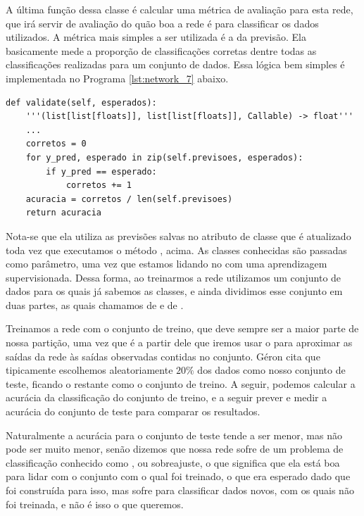 A última função dessa classe é calcular uma métrica de avaliação para esta rede, que irá servir de avaliação do quão boa a rede é para classificar os dados utilizados. A métrica mais simples a ser utilizada é a  da previsão. Ela basicamente mede a proporção de classificações corretas dentre todas as classificações realizadas para um conjunto de dados. Essa lógica bem simples é implementada no Programa \ref{lst:network_7} abaixo. 
\newline
\estiloR
\begin{lstlisting}[caption={Trecho da classe \eng{Network}}, label={lst:network_7}, escapeinside={\%}]
def validate(self, esperados):
    '''(list[list[floats]], list[list[floats]], Callable) -> float'''
    ...
    corretos = 0
    for y_pred, esperado in zip(self.previsoes, esperados):
        if y_pred == esperado:
            corretos += 1
    acuracia = corretos / len(self.previsoes)
    return acuracia
\end{lstlisting}


Nota-se que ela utiliza as previsões salvas no atributo de classe que é atualizado toda vez que executamos o método , acima. As classes conhecidas são passadas como parâmetro, uma vez que estamos lidando no  com uma aprendizagem supervisionada. Dessa forma, ao treinarmos a rede utilizamos um conjunto de dados para os quais já sabemos as classes, e ainda dividimos esse conjunto em duas partes, as quais chamamos de  e de .

Treinamos a rede com o conjunto de treino, que deve sempre ser a maior parte de nossa partição, uma vez que é a partir dele que iremos usar o  para aproximar as saídas da rede às saídas observadas contidas no conjunto. Géron \citep{hands} cita que tipicamente escolhemos aleatoriamente $20\%$ dos dados como nosso conjunto de teste, ficando o restante como o conjunto de treino. A seguir, podemos calcular a acurácia da classificação do conjunto de treino, e a seguir prever e medir a acurácia do conjunto de teste para comparar os resultados. 

Naturalmente a acurácia para o conjunto de teste tende a ser menor, mas não pode ser muito menor, senão dizemos que nossa rede sofre de um problema de classificação conhecido como , ou sobreajuste, o que significa que ela está boa para lidar com o conjunto com o qual foi treinado, o que era esperado dado que foi construída para isso, mas sofre para classificar dados novos, com os quais não foi treinada, e não é isso o que queremos. 

